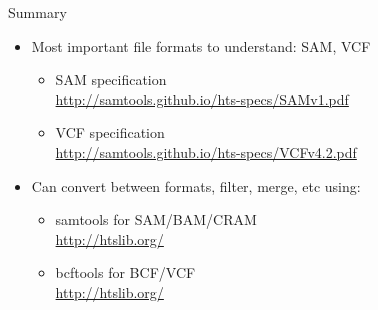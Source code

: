 \documentclass{beamer}
\begin{document}
\begin{frame}{Summary}

  \begin{itemize}
  \item
    Most important file formats to understand: SAM, VCF
    \begin{itemize}
    \item SAM specification \\
    \url{http://samtools.github.io/hts-specs/SAMv1.pdf}
    \item VCF specification \\
    \url{http://samtools.github.io/hts-specs/VCFv4.2.pdf}
    \end{itemize}
  \item
    Can convert between formats, filter, merge, etc using:
    \begin{itemize}
    \item samtools for SAM/BAM/CRAM \\
    \url{http://htslib.org/}
    \item bcftools for BCF/VCF \\
    \url{http://htslib.org/}
    \end{itemize}
  \end{itemize}

\end{frame}
\end{document}
